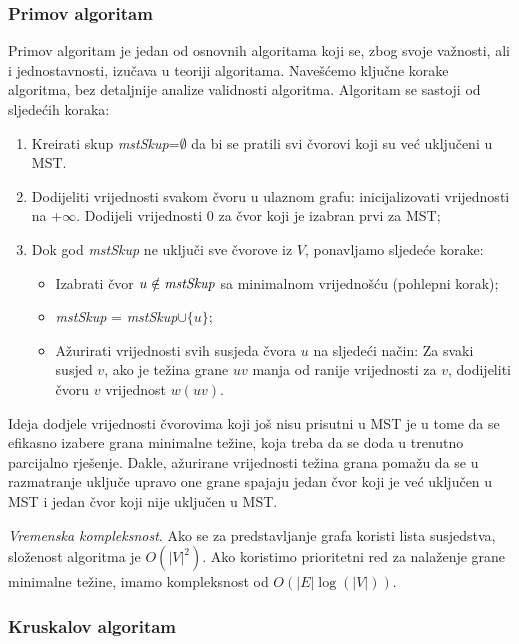 \documentclass[a4paper, utf8, 11pt, colorlinks]{book}
\theoremstyle{definition}
\begin{document}
\subsubsection{Primov algoritam}

Primov algoritam je jedan od osnovnih algoritama koji se, zbog svoje važnosti, ali i jednostavnosti, izučava u teoriji algoritama. Navešćemo ključne korake algoritma, bez detaljnije analize validnosti algoritma. Algoritam se sastoji od sljedećih koraka:

\begin{enumerate}
	\item Kreirati skup \emph{mstSkup}=$\emptyset$ da bi se pratili svi čvorovi koji su već uključeni u MST.
	\item Dodijeliti vrijednosti svakom čvoru u ulaznom grafu: inicijalizovati vrijednosti na +$\infty$. 
	      Dodijeli vrijednosti 0 za čvor koji je izabran prvi za MST;
	\item Dok god \emph{mstSkup} ne uključi sve čvorove iz $V$, ponavljamo sljedeće korake:
	\begin{itemize}
		\item Izabrati čvor $u\notin\emph{mstSkup} $ sa minimalnom vrijednošću (pohlepni korak);
		\item \emph{mstSkup} = \emph{mstSkup}$\cup \{u\}$;
		\item Ažurirati vrijednosti svih susjeda čvora $u$ na sljedeći način:
		     Za svaki susjed $v$, ako je težina grane $uv$ manja od
		             ranije vrijednosti za $v$, dodijeliti  čvoru $v$ vrijednost $w(uv)$. 		    
	        
	\end{itemize}
\end{enumerate}

Ideja dodjele vrijednosti čvorovima koji još nisu prisutni u MST je u tome da se efikasno izabere grana minimalne težine, koja treba da se doda u trenutno parcijalno rješenje. Dakle, ažurirane vrijednosti težina grana pomažu da se u razmatranje uključe upravo one grane spajaju jedan čvor koji je već uključen u MST i jedan čvor koji nije uključen u MST.

 \emph{Vremenska kompleksnost}. Ako se za predstavljanje grafa koristi lista susjedstva, složenost algoritma je $O(|V|^2)$. Ako  koristimo prioritetni red za nalaženje grane minimalne težine, imamo kompleksnost od $O( |E| \log(|V|))$. 



\subsubsection{Kruskalov algoritam}
\end{document}
